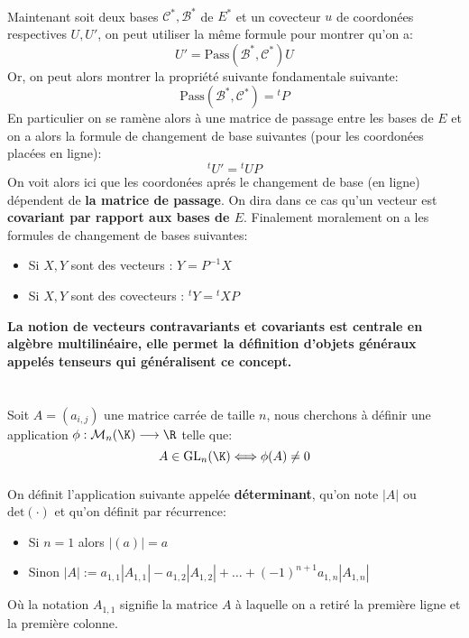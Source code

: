 \subsection*{}
Maintenant soit deux bases \( \mathscr{C}^*, \mathscr{B}^*\) de \(E^*\) et un covecteur \(u\) de coordonées respectives \(U, U'\), on peut utiliser la même formule pour montrer qu'on a:
\[
   U' = \text{Pass}(\mathscr{B}^*, \mathscr{C}^*)U
\]
Or, on peut alors montrer la propriété suivante fondamentale suivante:
\[
   \text{Pass}(\mathscr{B}^*, \mathscr{C}^*) = {}^tP
\]
En particulier on se ramène alors à une matrice de passage entre les bases de \(E\) et on a alors la formule de changement de base suivantes (pour les coordonées placées en ligne):
\[
   {}^tU' = {}^tUP
\]
On voit alors ici que les coordonées aprés le changement de base (en ligne) dépendent de \textbf{la matrice de passage}. On dira dans ce cas qu'un vecteur est \textbf{covariant par rapport aux bases de \(E\)}. Finalement moralement on a les formules de changement de bases suivantes:

\begin{itemize}
   \item Si \(X, Y\) sont des vecteurs : \(Y = P^{-1}X\)
   \item Si \(X, Y\) sont des covecteurs : \({}^tY = {}^tXP\)
\end{itemize}
\begin{center}
   \textbf{La notion de vecteurs contravariants et covariants est centrale en algèbre multilinéaire, elle permet la définition d'objets généraux appelés tenseurs qui généralisent ce concept.}
\end{center}
\chapter*{} %

Soit \(A = (a_{i,j})\) une matrice carrée de taille \(n\), nous cherchons à définir une application \(\phi: \mathcal{M}_n(\K) \longrightarrow \R\) telle que:
\[
   A \in \text{GL}_n(\K) \Longleftrightarrow \phi(A) \neq 0
\]
\subsection*{}
On définit l'application suivante appelée \textbf{déterminant}, qu'on note \(|A|\) ou \( \text{det}( \cdot) \) et qu'on définit par récurrence:
\begin{itemize}
   \item Si \(n = 1\) alors \(|(a)| = a \) 
   \item Sinon \(|A| := a_{1, 1}|A_{1, 1}| - a_{1, 2}|A_{1, 2}| + \ldots + (-1)^{n+1}a_{1, n}|A_{1, n}|\)
\end{itemize}
Où la notation \(A_{1, 1}\) signifie la matrice \(A\) à laquelle on a retiré la première ligne et la première colonne. \<

